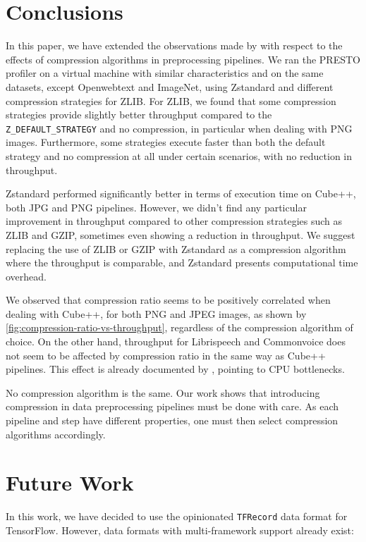\documentclass[sigconf,nonacm]{acmart}
\begin{document}
\section{Conclusions}
In this paper, we have extended the observations made by \citet{isenko2022bottleneck} with respect to the effects of compression algorithms in preprocessing pipelines.
We ran the PRESTO profiler on a virtual machine with similar characteristics and on the same datasets, except Openwebtext and ImageNet, using Zstandard and different compression strategies for ZLIB.
For ZLIB, we found that some compression strategies provide slightly better throughput compared to the \texttt{Z\_DEFAULT\_STRATEGY} and no compression, in particular when dealing with PNG images.
Furthermore, some strategies execute faster than both the default strategy and no compression at all under certain scenarios, with no reduction in throughput.

Zstandard performed significantly better in terms of execution time on Cube++, both JPG and PNG pipelines.
However, we didn't find any particular improvement in throughput compared to other compression strategies such as ZLIB and GZIP, sometimes even showing a reduction in throughput.
We suggest replacing the use of ZLIB or GZIP with Zstandard as a compression algorithm where the throughput is comparable, and Zstandard presents computational time overhead.

We observed that compression ratio seems to be positively correlated when dealing with Cube++, for both PNG and JPEG images, as shown by \autoref{fig:compression-ratio-vs-throughput}, regardless of the compression algorithm of choice.
On the other hand, throughput for Librispeech and Commonvoice does not seem to be affected by compression ratio in the same way as Cube++ pipelines.
This effect is already documented by \cite{isenko2022bottleneck}, pointing to CPU bottlenecks.

No compression algorithm is the same.
Our work shows that introducing compression in data preprocessing pipelines must be done with care.
As each pipeline and step have different properties, one must then select compression algorithms accordingly.

\section{Future Work}
In this work, we have decided to use the opinionated \texttt{TFRecord} data format for TensorFlow.
However, data formats with multi-framework support already exist:
\end{document}
